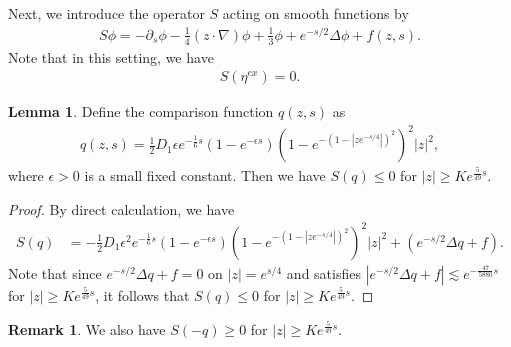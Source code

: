 \documentclass[11pt,reqno]{amsart}
\theoremstyle{definition}
\theoremstyle{bfremark}
\newtheorem{remark}{Remark}[section]
\newtheorem{lemma}{Lemma}[section]
\numberwithin{equation}{section}
\begin{document}
Next, we introduce the operator \(S\) acting on smooth functions by
\begin{align*}
    S \phi=-\partial_s \phi-\frac{1}{4}(z \cdot \nabla)\phi+\frac{1}{3}\phi+e^{-s/2}\Delta\phi+f(z,s).
\end{align*}
Note that in this setting, we have
\begin{align*}
    S(\eta^{ex})=0.
\end{align*}

\begin{lemma}
\label{lem:compari}
    Define the comparison function \(q(z,s)\) as
\begin{align*}
    q(z,s)=\frac{1}{2}D_1\epsilon e^{-\frac{1}{6}s}(1-e^{-\epsilon s})\left(1-e^{-(1-|ze^{-s/4}|)^2}\right)^2|z|^2,
\end{align*}
where \(\epsilon>0\) is a small fixed constant. Then we have \(S(q) \leq 0\) for \(|z| \geq Ke^{\frac{5}{49}s}\).
    
\end{lemma}
\begin{proof}
    By direct calculation, we have
    \begin{align*}
        S(q)&=-\frac{1}{2}D_1\epsilon^2e^{-\frac{1}{6}s}(1-e^{-\epsilon s})\left(1-e^{-(1-|ze^{-s/4}|)^2}\right)^2|z|^2+(e^{-s/2}\Delta q+f).
    \end{align*}
    Note that since \(e^{-s/2}\Delta q+f=0\) on \(|z|=e^{s/4}\) and satisfies \(|e^{-s/2}\Delta q+f| \lesssim e^{-\frac{47}{5880}s}\) for \(|z| \geq Ke^{\frac{5}{49}s}\), it follows that \(S(q) \leq 0\) for \(|z| \geq Ke^{\frac{5}{49}s}\).
\end{proof}
\begin{remark}
\label{rmk:S(-q)geq0}
    We also have \(S(-q) \geq 0\) for \(|z| \geq Ke^{\frac{5}{49}s}\).
\end{remark}
\end{document}
